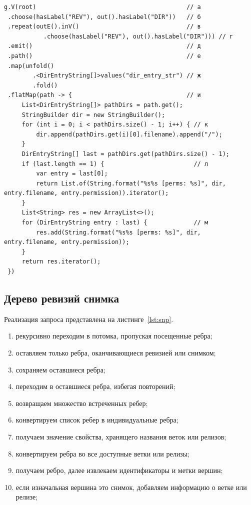 \documentclass[times,specification,annotation]{itmo-student-thesis}
\begin{document}
\begin{lstlisting}[float=H,caption={Список файлов ревизии на Gremlin},label={lst:rec}]
g.V(root)                                          // а
 .choose(hasLabel("REV"), out().hasLabel("DIR"))   // б
 .repeat(outE().inV()                              // в
           .choose(hasLabel("REV"), out().hasLabel("DIR"))) // г
 .emit()                                           // д
 .path()                                           // е
 .map(unfold()
        .<DirEntryString[]>values("dir_entry_str") // ж
        .fold()
 .flatMap(path -> {                                // и
     List<DirEntryString[]> pathDirs = path.get();
     StringBuilder dir = new StringBuilder();
     for (int i = 0; i < pathDirs.size() - 1; i++) { // к
         dir.append(pathDirs.get(i)[0].filename).append("/");
     }
     DirEntryString[] last = pathDirs.get(pathDirs.size() - 1);
     if (last.length == 1) {                         // л
         var entry = last[0];
         return List.of(String.format("%s%s [perms: %s]", dir, entry.filename, entry.permission)).iterator();
     }
     List<String> res = new ArrayList<>();
     for (DirEntryString entry : last) {             // м
         res.add(String.format("%s%s [perms: %s]", dir, entry.filename, entry.permission));
     }
     return res.iterator();
 })
\end{lstlisting}

\subsection{Дерево ревизий снимка}

Реализация запроса представлена на листинге~\ref{lst:snp}.
\begin{enumerate}
    \item рекурсивно переходим в потомка, пропуская посещенные ребра;
    \item оставляем только ребра, оканчивающиеся ревизией или снимком;
    \item сохраняем оставшиеся ребра;
    \item переходим в оставшиеся ребра, избегая повторений;
    \item возвращаем множество встреченных ребер;
    \item конвертируем список ребер в индивидуальные ребра;
    \item получаем значение свойства, хранящего названия веток или релизов;
    \item конвертируем ребра во все доступные ветки или релизы;
    \item получаем ребро, далее извлекаем идентификаторы и метки вершин;
    \item если изначальная вершина это снимок, добавляем информацию о ветке или релизе;
\end{enumerate}
\end{document}
